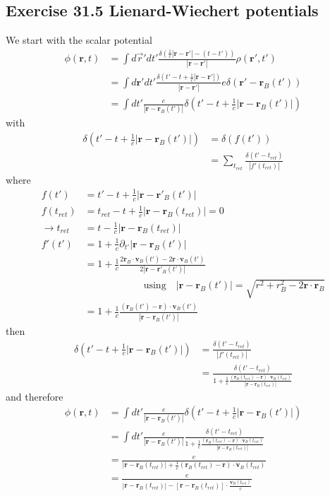 \documentclass[../main.tex]{subfiles}
\begin{document}
\subsection{Exercise 31.5 Lienard-Wiechert potentials}
We start with the scalar potential
\begin{align}
\phi(\mathbf{r},t)&=\int d\vec{r}'dt'\frac{\delta(\frac{1}{c}|\mathbf{r}-\mathbf{r}'|-(t-t'))}{|\mathbf{r}-\mathbf{r}'|}\rho(\mathbf{r}',t')\\
&=\int d\mathbf{r}'dt'\frac{\delta(t'-t+\frac{1}{c}|\mathbf{r}-\mathbf{r}'|)}{|\mathbf{r}-\mathbf{r}'|}e\delta(\mathbf{r}'-\mathbf{r}_B(t'))\\
&=\int dt'\frac{e}{|\mathbf{r}-\mathbf{r}_B(t')|}\delta(t'-t+\frac{1}{c}|\mathbf{r}-\mathbf{r}_B(t')|)
\end{align}
with
\begin{align}
\delta(t'-t+\frac{1}{c}|\mathbf{r}-\mathbf{r}_B(t')|)&=\delta(f(t'))\\
&=\sum_{t_{ret}}\frac{\delta(t'-t_{ret})}{|f'(t_{ret})|}
\end{align}
where
\begin{align}
f(t')&=t'-t+\frac{1}{c}|\mathbf{r}-\mathbf{r}'_B(t')|\\
f(t_{ret})&=t_{ret}-t+\frac{1}{c}|\mathbf{r}-\mathbf{r}_B(t_{ret})|=0\\
\rightarrow t_{ret}&=t-\frac{1}{c}|\mathbf{r}-\mathbf{r}_B(t_{ret})|\\
f'(t')&=1+\frac{1}{c}\partial_{t'}|\mathbf{r}-\mathbf{r}_B(t')|\\
&=1+\frac{1}{c}\frac{2\mathbf{r}_{B}\cdot\mathbf{v}_{B}(t')-2\mathbf{r}\cdot\mathbf{v}_{B}(t')}{2|\mathbf{r}-\mathbf{r}'_B(t')|}\\
&\qquad\qquad\qquad\text{using}\quad|\mathbf{r}-\mathbf{r}_B(t')|=\sqrt{r^2+r_B^2-2\mathbf{r}\cdot\mathbf{r}_B}\\
&=1+\frac{1}{c}\frac{(\mathbf{r}_{B}(t')-\mathbf{r})\cdot\mathbf{v}_{B}(t')}{|\mathbf{r}-\mathbf{r}_B(t')|}
\end{align}
then
\begin{align}
\delta(t'-t+\frac{1}{c}|\mathbf{r}-\mathbf{r}_B(t')|)
&=\frac{\delta(t'-t_{ret})}{|f'(t_{ret})|}\\
&=\frac{\delta(t'-t_{ret})}{1+\frac{1}{c}\frac{(\mathbf{r}_{B}(t_{ret})-\mathbf{r})\cdot\mathbf{v}_{B}(t_{ret})}{|\mathbf{r}-\mathbf{r}_B(t_{ret})|}}
\end{align}
and therefore
\begin{align}
\phi(\mathbf{r},t)
&=\int dt'\frac{e}{|\mathbf{r}-\mathbf{r}_B(t')|}\delta(t'-t+\frac{1}{c}|\mathbf{r}-\mathbf{r}_B(t')|)\\
&=\int dt'\frac{e}{|\mathbf{r}-\mathbf{r}_B(t')|}\frac{\delta(t'-t_{ret})}{1+\frac{1}{c}\frac{(\mathbf{r}_{B}(t_{ret})-\mathbf{r})\cdot\mathbf{v}_{B}(t_{ret})}{|\mathbf{r}-\mathbf{r}_B(t_{ret})|}}\\
&=\frac{e}{|\mathbf{r}-\mathbf{r}_B(t_{ret})|+\frac{1}{c}(\mathbf{r}_{B}(t_{ret})-\mathbf{r})\cdot\mathbf{v}_{B}(t_{ret})}\\
&=\frac{e}{|\mathbf{r}-\mathbf{r}_B(t_{ret})|-[\mathbf{r}-\mathbf{r}_{B}(t_{ret})]\cdot\frac{\mathbf{v}_{B}(t_{ret})}{c}}
\end{align}
\end{document}
